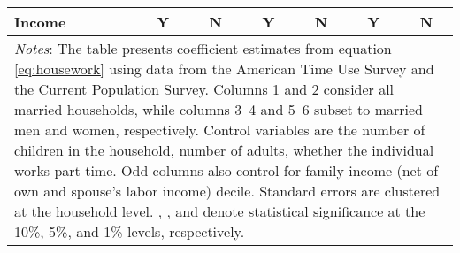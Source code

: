 {\begin{tabular}{l*{6}{c}}
Income              &           Y         &           N         &           Y         &           N         &           Y         &           N         \\
\bottomrule
\multicolumn{7}{p{17cm}}{\footnotesize \textit{Notes}: The table presents coefficient estimates from equation \ref{eq:housework} using data from the American Time Use Survey and the Current Population Survey. Columns 1 and 2 consider all married households, while columns 3--4 and 5--6 subset to married men and women, respectively. Control variables are the number of children in the household, number of adults, whether the individual works part-time. Odd columns also control for family income (net of own and spouse's labor income) decile. Standard errors are clustered at the household level. \sym{*}, \sym{**}, and \sym{***} denote statistical significance at the 10\%, 5\%, and 1\% levels, respectively.}\\
\end{tabular}
}
